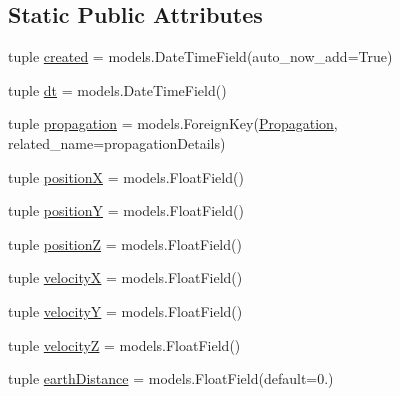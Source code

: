 \subsection*{Static Public Attributes}
\begin{DoxyCompactItemize}
\item 
tuple \hyperlink{class_ground_segment_1_1models_1_1_propagation_detail_1_1_propagation_detail_ad7e2ec78c0134fd9d718e09b68d4bbfc}{created} = models.\+Date\+Time\+Field(auto\+\_\+now\+\_\+add=True)
\item 
tuple \hyperlink{class_ground_segment_1_1models_1_1_propagation_detail_1_1_propagation_detail_aa2fb4a49e9ee276473bf1f382ce44cf7}{dt} = models.\+Date\+Time\+Field()
\item 
tuple \hyperlink{class_ground_segment_1_1models_1_1_propagation_detail_1_1_propagation_detail_a4c6022e53fef3a255ae7d9453e615b52}{propagation} = models.\+Foreign\+Key(\hyperlink{class_ground_segment_1_1models_1_1_propagation_1_1_propagation}{Propagation}, related\+\_\+name=\textquotesingle{}propagation\+Details\textquotesingle{})
\item 
tuple \hyperlink{class_ground_segment_1_1models_1_1_propagation_detail_1_1_propagation_detail_afab79af8d95f0067880b215b7857e000}{position\+X} = models.\+Float\+Field()
\item 
tuple \hyperlink{class_ground_segment_1_1models_1_1_propagation_detail_1_1_propagation_detail_a9950144bf129bba080e6a6e3380a0a9f}{position\+Y} = models.\+Float\+Field()
\item 
tuple \hyperlink{class_ground_segment_1_1models_1_1_propagation_detail_1_1_propagation_detail_a92f9fb549c5a8a95cac5e80ec8968ae6}{position\+Z} = models.\+Float\+Field()
\item 
tuple \hyperlink{class_ground_segment_1_1models_1_1_propagation_detail_1_1_propagation_detail_a29de2a45acb09acda6998ce7afb12ed0}{velocity\+X} = models.\+Float\+Field()
\item 
tuple \hyperlink{class_ground_segment_1_1models_1_1_propagation_detail_1_1_propagation_detail_af415fab52fc62626041d4d7a75604413}{velocity\+Y} = models.\+Float\+Field()
\item 
tuple \hyperlink{class_ground_segment_1_1models_1_1_propagation_detail_1_1_propagation_detail_ac562c9a45f93f8f9d46f7aa89adaf569}{velocity\+Z} = models.\+Float\+Field()
\item 
tuple \hyperlink{class_ground_segment_1_1models_1_1_propagation_detail_1_1_propagation_detail_a98f9ff07f0d54a2b315b4ad247c9c4eb}{earth\+Distance} = models.\+Float\+Field(default=0.)
\end{DoxyCompactItemize}


